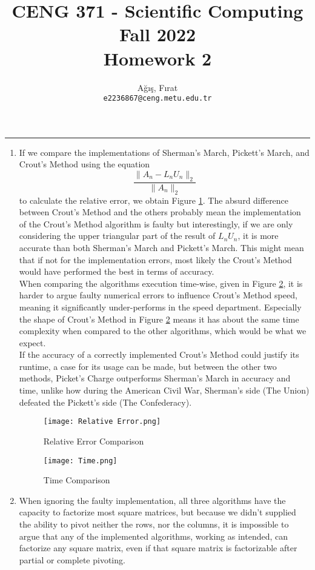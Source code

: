 \documentclass[10pt,a4paper, margin=1in]{article}
\author{
  Ağış, Fırat\\
  \texttt{e2236867@ceng.metu.edu.tr}
}
\title{CENG 371 - Scientific Computing \\
Fall 2022 \\
Homework 2}
\begin{document}
\maketitle

\noindent\rule{19cm}{1.2pt}

\begin{enumerate}
    \item %
    	If we compare the implementations of Sherman's March, Pickett's March, and Crout's Method using the equation $$\frac{\|A_n - L_n U_n \|_2}{\|A_n\|_2} $$ to calculate the relative error, we obtain Figure \ref{RelError}. The absurd difference between Crout's Method and the others probably mean the implementation of the Crout's Method algorithm is faulty but interestingly, if we are only considering the upper triangular part of the result of $L_nU_n$, it is more accurate than both Sherman's March and Pickett's March. This might mean that if not for the implementation errors, most likely the Crout's Method would have performed the best in terms of accuracy. \\
    	When comparing the algorithms execution time-wise, given in Figure \ref{Time}, it is harder to argue faulty numerical errors to influence Crout's Method speed, meaning it significantly under-performs in the speed department. Especially the shape of Crout's Method in Figure \ref{Time} means it has about the same time complexity when compared to the other algorithms, which would be what we expect.\\
    	If the accuracy of a correctly implemented Crout's Method could justify its runtime, a case for its usage can be made, but between the other two methods, Picket's Charge outperforms Sherman's March in accuracy and time, unlike how during the American Civil War, Sherman's side (The Union) defeated the Pickett's side (The Confederacy).
    	\begin{figure}[h]
  			\centering
  			\texttt{[image: Relative Error.png]}
  			\caption{Relative Error Comparison}
  			\label{RelError}
		\end{figure}
		
		\begin{figure}[h]
  			\centering
  			\texttt{[image: Time.png]}
  			\caption{Time Comparison}
  			\label{Time}
		\end{figure}
    	
    \item %
    	When ignoring the faulty implementation, all three algorithms have the capacity to factorize most square matrices, but because we didn't supplied the ability to pivot neither the rows, nor the columns, it is impossible to argue that any of the implemented algorithms, working as intended, can factorize any square matrix, even if that square matrix is factorizable after partial or complete pivoting.

\end{enumerate}
\end{document}
